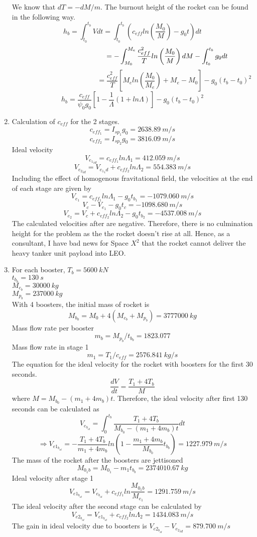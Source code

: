 \begin{enumerate}[label=(\alph*)]
We know that $dT=-dM/m$. The burnout height of the rocket can be found in the following way.
$$ h_b = \int_{t_0}^{t_b} Vdt = \int_{t_0}^{t_b}\left( c_{eff}ln\left(\frac{M_0}{M}\right)-g_0t\right)dt$$
$$\hspace{3.5cm}=-\int_{M_0}^{M_e} \frac{c_{eff}^2}{T}ln\left(\frac{M_0}{M}\right)dM-\int_{t_0}^{t_b}g_0dt$$
$$\hspace{5cm}=\frac{c_{eff}^2}{T}\left[M_eln\left(\frac{M_0}{M_e}\right)+M_e-M_0\right]-g_0(t_b-t_0)^2$$
$$h_b = \frac{c_{eff}}{\psi_0g_0}\left[1-\frac{1}{\Lambda}\left(1+ln\Lambda\right)\right]-g_0(t_b-t_0)^2$$

\item
Calculation of $c_{eff}$ for the 2 stages.
$$c_{eff_1} = I_{sp_1}g_0 = 2638.89 \:m/s$$
$$c_{eff_2} = I_{sp_2}g_0 = 3816.09 \:m/s$$
Ideal velocity
$$V_{{e_1}_{id}} = c_{eff_1}ln\Lambda_1 = 412.059 \: m/s$$
$$V_{{e_2}_{id}} = V_{{e_1}_id}+ c_{eff_2}ln\Lambda_2 = 554.383 \: m/s$$ 
Including the effect of homogenous fravitational field, the velocities at the end of each stage are given by
$$V_{e_1} = c_{eff_1}ln\Lambda_1-g_0t_{b_1} = -1079.060 \: m/s$$
$$V_c - V_{e_1}-g_0t_c=-1098.680 \: m/s$$
$$V_{e_2} = V_{c} + c_{eff_2}ln\Lambda_2-g_0t_{b_2}=-4537.008 \: m/s$$
The calculated velocities after are negative. Therefore, there is no culmination height for the problem as the the rocket doesn't rise at all. Hence, as a consultant, I have bad news for Space $X^2$ that the rocket cannot deliver the heavy tanker unit payload into LEO.

\item
For each booster,
$T_b=5600\: kN$\\
$t_{b_b}=130 \: s$\\
$M_{c_b}=30000 \: kg$\\
$M_{p_b}=237000\: kg$\\
With 4 boosters, the initial mass of rocket is
$$M_{b_0}=M_0+4(M_{c_b}+M_{p_b})=3777000\: kg$$
Mass flow rate per booster
$$m_b=M_{p_b}/t_{b_b}=1823.077$$
Mass flow rate in stage 1
$$m_1 = T_1/c_{eff} = 2576.841 \: kg/s$$
The equation for the ideal velocity for the rocket with boosters for the first 30 seconds.
$$\frac{dV}{dt}=\frac{T_1+4T_b}{M}$$
where $M=M_{b_0}-(m_1+4m_b)t$.
Therefore, the ideal velocity after first 130 seconds can be calculated as
$$V_{e_{b_{id}}} = \int^{t_b}_0 \frac{T_1+4T_b}{M_{b_0}-(m_1+4m_b)t}dt$$
$$\Rightarrow V_{e1_{b_{id}}} = -\frac{T_1+4T_b}{m_1+4m_b}ln\left(1-\frac{m_1+4m_b}{M_{b_0}}t_{b_b}\right)=1227.979\: m/s$$
The mass of the rocket after the boosters are jettisoned
$$M_{0_1b}=M_{0_1}-m_1t_{b_b}=2374010.67\: kg$$
Ideal velocity after stage 1
$$V_{e1_{b_{id}}}=V_{e_{b_{id}}}+c_{eff_1}ln\frac{M_{0_1b}}{M_{e_1}}=1291.759\: m/s$$
The ideal velocity after the second stage can be calculated by
$$V_{e2_{b_{id}}} = V_{e1_{b_{id}}}+c_{eff_2}ln\Lambda_2 = 1434.083\: m/s$$
The gain in ideal velocity due to boosters is $V_{e2_{b_{id}}}-V_{{e_2}_{id}}=879.700\: m/s$


\end{enumerate}
